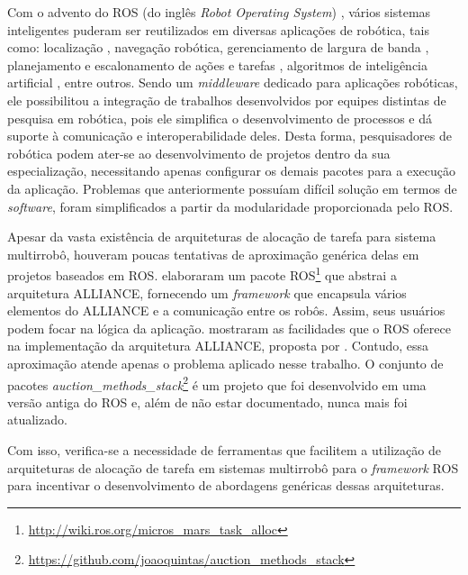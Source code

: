         Com o advento do ROS (do inglês \textit{Robot Operating System}) \cite{ref:quigley2009ros}, vários sistemas inteligentes puderam ser reutilizados em diversas aplicações de robótica, tais como: localização \cite{ref:li2017kld-samcl}, navegação robótica, gerenciamento de largura de banda \cite{ref:julio2015dynamic}, planejamento e escalonamento de ações e tarefas \cite{ref:fox2003pddl2, ref:manne1960job}, algoritmos de inteligência artificial \cite{ref:adrianohrl2015fuzzy, ref:watkins1992qlearning}, entre outros. Sendo um \textit{middleware} dedicado para aplicações robóticas, ele possibilitou a integração de trabalhos desenvolvidos por equipes distintas de pesquisa em robótica, pois ele simplifica o desenvolvimento de processos e dá suporte à comunicação e interoperabilidade deles. Desta forma, pesquisadores de robótica podem ater-se ao desenvolvimento de projetos dentro da sua especialização, necessitando apenas configurar os demais pacotes para a execução da aplicação. Problemas que anteriormente possuíam difícil solução em termos de \textit{software}, foram simplificados a partir da modularidade proporcionada pelo ROS.
        
        Apesar da vasta existência de arquiteturas de alocação de tarefa para sistema multirrobô, houveram poucas tentativas de aproximação genérica delas em projetos baseados em ROS.  elaboraram um pacote ROS\footnote{\url{http://wiki.ros.org/micros_mars_task_alloc}} que abstrai a arquitetura ALLIANCE, fornecendo um \textit{framework} que encapsula vários elementos do ALLIANCE e a comunicação entre os robôs. Assim, seus usuários podem focar na lógica da aplicação.  mostraram as facilidades que o ROS oferece na implementação da arquitetura ALLIANCE, proposta por . Contudo, essa aproximação atende apenas o problema aplicado nesse trabalho. O conjunto de pacotes \textit{ auction\_methods\_stack}\footnote{\url{https://github.com/joaoquintas/auction_methods_stack}} é um projeto que foi desenvolvido em uma versão antiga do ROS e, além de não estar documentado, nunca mais foi atualizado. %
        
        Com isso, verifica-se a necessidade de ferramentas que facilitem a utilização de arquiteturas de alocação de tarefa em sistemas multirrobô para o \textit{framework} ROS para incentivar o desenvolvimento de abordagens genéricas dessas arquiteturas.
    
